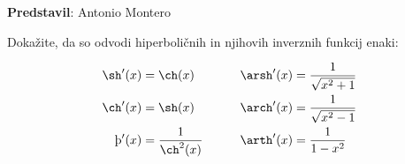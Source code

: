 \textbf{Predstavil}: Antonio Montero

Dokažite, da so odvodi hiperboličnih in njihovih inverznih funkcij enaki:
	
\begin{align*}
\sh'(x)&=\ch(x) &\qquad \arsh'(x)&= \frac{1}{\sqrt{x^{2}+1}} \\
\ch'(x)&=\sh(x) &\qquad \arch'(x)&= \frac{1}{\sqrt{x^{2}-1}} \\
\th'(x)&=\frac{1}{\ch^{2}(x)} &\qquad \arth'(x)&= \frac{1}{1-x^{2}} \\
\end{align*}